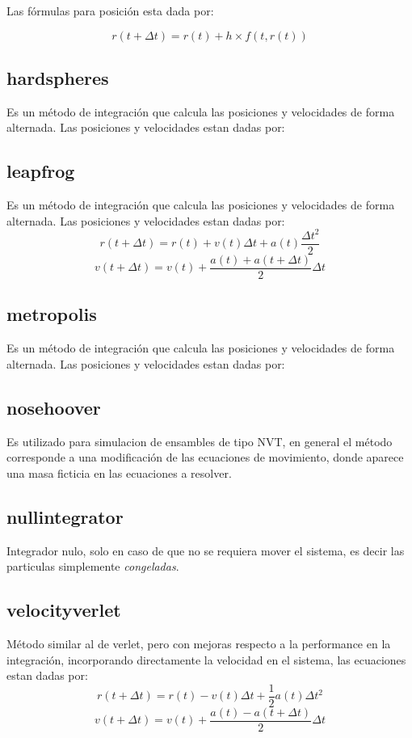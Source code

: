 Las f\'ormulas para posici\'on esta dada por:

$$r(t+\Delta t) = r(t) + h\times f(t,r(t))$$

\subsection{hardspheres}
Es un m\'etodo de integraci\'on que calcula las posiciones y velocidades de forma alternada. Las posiciones y velocidades estan dadas por:

\subsection{leapfrog}
Es un m\'etodo de integraci\'on que calcula las posiciones y velocidades de forma alternada. Las posiciones y velocidades estan dadas por:
$$r(t+\Delta t) = r(t) + v(t)\Delta t + a(t)\frac{\Delta t^2}{2}$$
$$v(t+\Delta t) = v(t) + \frac{a(t)+a(t+\Delta t)}{2}\Delta t$$

\subsection{metropolis}
Es un m\'etodo de integraci\'on que calcula las posiciones y velocidades de forma alternada. Las posiciones y velocidades estan dadas por:

\subsection{nosehoover}
Es utilizado para simulacion de ensambles de tipo NVT, en general el m\'etodo corresponde a una modificaci\'on de las ecuaciones de movimiento, donde aparece una masa ficticia en las ecuaciones a resolver.

\subsection{nullintegrator}
Integrador nulo, solo en caso de que no se requiera mover el sistema, es decir las particulas simplemente \textit{congeladas}.

\subsection{velocityverlet}
M\'etodo similar al de verlet, pero con mejoras respecto a la performance en la integraci\'on, incorporando directamente la velocidad en el sistema, las ecuaciones estan dadas por:
$$r(t+\Delta t) = r(t) - v(t)\Delta t + \frac{1}{2}a(t)\Delta t^2$$
$$v(t+\Delta t) = v(t) + \frac{a(t) - a(t + \Delta t)}{2}\Delta t$$

